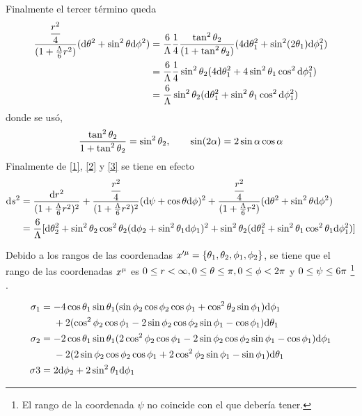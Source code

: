 Finalmente el tercer término queda
\begin{align}
  \frac{\dfrac{r^2}{4}}{(1+\frac{\Lambda	}{6}r^2)}(\dd\theta^2+\sin^2\theta\dd\phi^2)&=\frac{6}{\Lambda}\frac{1}{4}\frac{\tan^2\theta_2}{(1+\tan^2\theta_2)}(4\dd\theta_1^2+\sin^2(2\theta_1)\dd\phi_1^2)\\
  &=\frac{6}{\Lambda}\frac{1}{4}\sin^2\theta_2(4\dd\theta_1^2+4\sin^2\theta_1\cos^2\dd\phi_1^2)\\
  &=\frac{6}{\Lambda}\sin^2\theta_2(\dd\theta_1^2+\sin^2\theta_1\cos^2\dd\phi_1^2)\label{3}
\end{align}
donde se usó, 
\begin{equation}
  \frac{\tan^2\theta_2}{1+\tan^2\theta_2}=\sin^2\theta_2,\qquad \sin(2\alpha )=2\sin\alpha\cos\alpha 
\end{equation}
Finalmente de \eqref{1}, \eqref{2} y \eqref{3} se tiene en efecto
\begin{align}
  \dd s^2&=\frac{\dd r^2}{(1+\frac{\Lambda}{6}r^2)^2}+\frac{\dfrac{r^2}{4}}{(1+\frac{\Lambda}{6}r^2)^2}(\dd\psi+\cos\theta\dd\phi )^2+\frac{\dfrac{r^2}{4}}{(1+\frac{\Lambda}{6}r^2)}(\dd\theta^2+\sin^2\theta\dd\phi^2)\\
  &=\frac{6}{\Lambda}[\dd\theta_2^2+\sin^2\theta_2\cos^2\theta_2(\dd\phi_2+\sin^2\theta_1\dd\phi_1)^2+\sin^2\theta_2(\dd\theta_1^2+\sin^2\theta_1\cos^2\theta_1\dd\phi_1^2)]\label{no-6}
\end{align}


Debido a los rangos de las coordenadas $x'^\mu=\{\theta_1,\theta_2,\phi_1,\phi_2\}$, se tiene que el rango de las coordenadas $x^\mu$ es $0\leq r<\infty,0\leq\theta\leq\pi ,0\leq \phi<2\pi $ y \textcolor{purple}{$0\leq\psi\leq 6\pi $} \footnote{El rango de la coordenada $\psi$ no coincide con el que debería tener.} .



\begin{align}
  \sigma_1&=-4\cos\theta_1\sin\theta_1(\sin\phi_2\cos\phi_2\cos\phi_1+\cos^2\theta_2\sin\phi_1)\dd\phi_1\\
  &~~~~ + 2(\cos^2\phi_2\cos\phi_1-2\sin\phi_2\cos\phi_2\sin\phi_1-\cos\phi_1)\dd\theta_1\\
  \sigma_2&=-2\cos\theta_1\sin\theta_1(2\cos^2\phi_2\cos\phi_1-2\sin\phi_2\cos\phi_2\sin\phi_1-\cos\phi_1)\dd\phi_1\\
  &~~~~ -2(2\sin\phi_2\cos\phi_2\cos\phi_1+2\cos^2\phi_2\sin\phi_1-\sin\phi_1)\dd \theta_1\\
  \sigma3&=2\dd\phi_2+2\sin^2\theta_1\dd\phi_1
\end{align}












